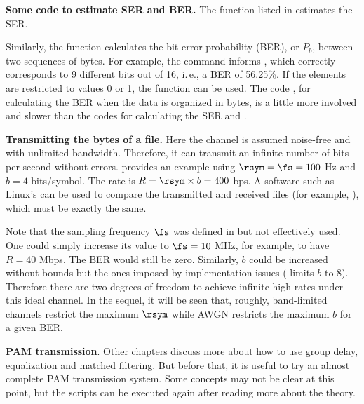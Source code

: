 \bApplication
\textbf{Some code to estimate SER and BER.}
The function  listed in  estimates the SER.

Similarly, the function  calculates the bit error probability (BER), or $P_b$, between two sequences of bytes. For example, the command  informs , which correctly corresponds to 9 different bits out of 16, i.\,e., a BER of 56.25\%. If the elements are restricted to values 0 or 1, the function  can be used. The code , for calculating the BER when the data is organized in bytes, is a little more involved and slower than the codes for calculating the SER and .
\eApplication 


\bApplication \textbf{Transmitting the bytes of a file.}
\label{app:bytes_transmission}
Here the channel is assumed noise-free and with unlimited bandwidth. Therefore, it can transmit an infinite number of bits per second without errors. 
 provides an example using $\rsym=\fs=100$ Hz and $b=4$ bits/symbol. The rate is $R = \rsym \times b = 400$ bps.
A software such as Linux's  can be used to compare the transmitted and received files (for example, ), which must be exactly the same.

Note that the sampling frequency $\fs$ was defined in  but not effectively used. One could simply increase its value to $\fs=10$ MHz, for example, to have $R=40$ Mbps. The BER would still be zero. Similarly, $b$ could be increased without bounds but the ones imposed by implementation issues ( limits $b$ to 8). Therefore there are two degrees of freedom to achieve infinite high rates under this ideal channel. In the sequel, it will be seen that, roughly, band-limited channels restrict the maximum $\rsym$ while AWGN restricts the maximum $b$ for a given BER.
\eApplication

\bApplication \textbf{PAM transmission}.
Other chapters discuss more about how to use group delay, equalization and matched filtering. But before that, it is useful to try an almost complete PAM transmission system. Some concepts may not be clear at this point, but the scripts can be executed again after reading more about the theory.

